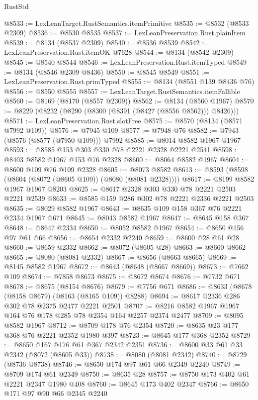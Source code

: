 \begin{lexlean}{RustStd}
\begin{coremodule}
{\begin{coremodule}
{{{{{{{{{{{{{{{{{{{{{{{{{{{{{{{{{{{{{{{{{{{{{{{{{{{{{@8533 := LexLeanTarget.RustSemantics.itemPrimitive
@8535 := @8532 (@8533 @2309)
@8536 := @8530 @8535
@8537 := LexLeanPreservation.Rust.plainItem
@8539 := @8134 (@8537 @2309)
@8540 := @8536 @8539
@8542 := LexLeanPreservation.Rust.itemOK @7628
@8544 := @8134 (@8542 @2309)
@8545 := @8540 @8544
@8546 := LexLeanPreservation.Rust.itemTyped
@8549 := @8134 (@8546 @2309 @8436)
@8550 := @8545 @8549
@8551 := LexLeanPreservation.Rust.primTyped
@8555 := @8134 (@8551 @139 @8436 @76)
@8556 := @8550 @8555
@8557 := LexLeanTarget.RustSemantics.itemFallible
@8560 := @8169 (@8170 (@8557 @2309))
@8562 := @8134 (@8560 @1967)
@8570 := @8229 (@8232 (@8290 (@8300 (@8391 (@8427 (@8556 @8562))) @8426)))
@8571 := LexLeanPreservation.Rust.slotFree
@8575 := @8570 (@8134 (@8571 @7992 @109))
@8576 := @7945 @109
@8577 := @7948 @76
@8582 := @7943 (@8576 (@8577 (@7950 @109))) @7992
@8585 := @8014 @8582 @1967 @1967
@8593 := @8585 @153 @303 @330 @78 @2221 @2328 @2221 @2541
@8598 := @8403 @8582 @1967 @153 @76 @2328
@8600 := @8064 @8582 @1967
@8604 := @8600 @109 @76 @109 @2328
@8605 := @8073 @8582
@8613 := @8593 (@8598 (@8604 (@8072 (@8605 @109)) (@8080 (@8081 @2328))))
@8617 := @8199 @8582 @1967 @1967 @8203
@8625 := @8617 @2328 @303 @330 @78 @2221 @2503 @2221 @2539
@8633 := @8585 @159 @286 @302 @78 @2221 @2336 @2221 @2503
@8635 := @8029 @8582 @1967
@8643 := @8635 @109 @158 @367 @76 @2221 @2334 @1967 @671
@8645 := @8043 @8582 @1967
@8647 := @8645 @158 @367
@8648 := @8647 @2334
@8650 := @8052 @8582 @1967
@8654 := @8650 @156 @97 @61 @66
@8656 := @8654 @2332 @2240
@8659 := @8600 @28 @61 @28
@8660 := @8659 @2332
@8662 := @8072 (@8605 @28)
@8663 := @8660 @8662
@8665 := @8080 (@8081 @2332)
@8667 := @8656 (@8663 @8665)
@8669 := @8145 @8582 @1967
@8672 := @8643 (@8648 (@8667 @8669))
@8673 := @7662 @109
@8674 := @7858 @8673
@8675 := @8672 @8674
@8676 := @7732 @671
@8678 := @8675 (@8154 @8676)
@8679 := @7756 @671
@8686 := @8633 (@8678 (@8158 @8679) (@8163 (@8165 @109)) @8288)
@8694 := @8617 @2336 @286 @302 @78 @2375 @2477 @2221 @2501
@8707 := @8216 @8582 @1967 @1967 @164 @76 @178 @285 @78 @2354 @164 @2257 @2374 @2477
@8709 := @8095 @8582 @1967
@8712 := @8709 @178 @76 @2354
@8720 := @8635 @23 @177 @368 @76 @2221 @2352 @1980 @397
@8723 := @8645 @177 @368 @2352
@8729 := @8650 @167 @176 @61 @367 @2342 @2351
@8736 := @8600 @33 @61 @33 @2342 (@8072 (@8605 @33))
@8738 := @8080 (@8081 @2342)
@8740 := @8729 (@8736 @8738)
@8746 := @8650 @174 @97 @61 @66 @2349 @2240
@8749 := @8709 @174 @61 @2349
@8750 := @8635 @28
@8757 := @8750 @173 @402 @61 @2221 @2347 @1980 @408
@8760 := @8645 @173 @402 @2347
@8766 := @8650 @171 @97 @90 @66 @2345 @2240
}}}}}}}}}}}}}}}}}}}}}}}}}}}}}}}}}}}}}}}}}}}}}}}}}}}}}
\end{coremodule}}
\end{coremodule}
\end{lexlean}
